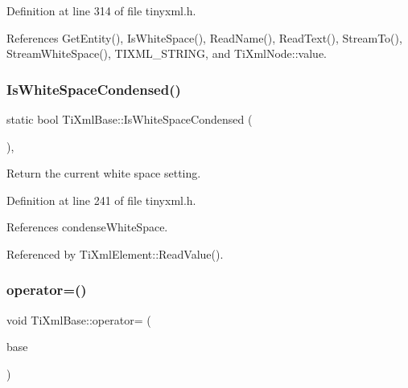 Definition at line 314 of file tinyxml.\+h.



References Get\+Entity(), Is\+White\+Space(), Read\+Name(), Read\+Text(), Stream\+To(), Stream\+White\+Space(), T\+I\+X\+M\+L\+\_\+\+S\+T\+R\+I\+NG, and Ti\+Xml\+Node\+::value.

\hypertarget{class_ti_xml_base_ad4b1472531c647a25b1840a87ae42438}{}\label{class_ti_xml_base_ad4b1472531c647a25b1840a87ae42438} 
\subsubsection{\texorpdfstring{Is\+White\+Space\+Condensed()}{IsWhiteSpaceCondensed()}}
{\footnotesize\ttfamily static bool Ti\+Xml\+Base\+::\+Is\+White\+Space\+Condensed (\begin{DoxyParamCaption}{ }\end{DoxyParamCaption})\hspace{0.3cm}{\ttfamily [inline]}, {\ttfamily [static]}}



Return the current white space setting. 



Definition at line 241 of file tinyxml.\+h.



References condense\+White\+Space.



Referenced by Ti\+Xml\+Element\+::\+Read\+Value().

\hypertarget{class_ti_xml_base_a183315aa6f1bb36d509b179e912cb93f}{}\label{class_ti_xml_base_a183315aa6f1bb36d509b179e912cb93f} 
\subsubsection{\texorpdfstring{operator=()}{operator=()}}
{\footnotesize\ttfamily void Ti\+Xml\+Base\+::operator= (\begin{DoxyParamCaption}\item[{const \hyperlink{class_ti_xml_base}{Ti\+Xml\+Base} \&}]{base }\end{DoxyParamCaption})\hspace{0.3cm}{\ttfamily [private]}}

